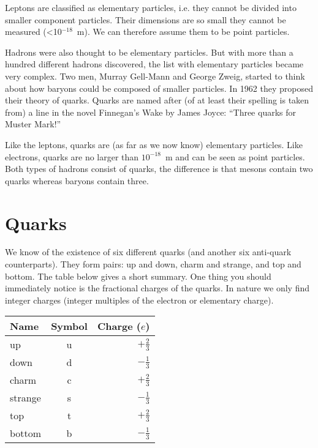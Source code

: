 \vspace{0.5cm}

Leptons are classified as elementary particles, i.e. they cannot be divided into smaller component particles. Their dimensions are so small they cannot be measured (\textless10$^{-18}$~m). We can therefore assume them to be point particles.

Hadrons were also thought to be elementary particles. But with more than a hundred different hadrons discovered, the list with elementary particles became very complex. Two men, Murray Gell-Mann and George Zweig, started to think about how baryons could be composed of smaller particles. In 1962 they proposed their theory of quarks. Quarks are named after (of at least their spelling is taken from) a line in the novel Finnegan's Wake by James Joyce: ``Three quarks for Muster Mark!''

Like the leptons, quarks are (as far as we now know) elementary particles. Like electrons, quarks are no larger than $10^{-18}$~m and can be seen as point particles. Both types of hadrons consist of quarks, the difference is that mesons contain two quarks whereas baryons contain three.

\section{Quarks}
We know of the existence of six different quarks (and another six anti-quark counterparts). They form pairs: up and down, charm and strange, and top and bottom. The table below gives a short summary. One thing you should immediately notice is the fractional charges of the quarks. In nature we only find integer charges (integer multiples of the electron or elementary charge).

\begin{center}\begin{tabular}[h] {l c r}
Name & Symbol & Charge ($e$) \\ \hline
up & u & $+\frac{2}{3}$ \\
down & d & $-\frac{1}{3}$ \\
charm & c & $+\frac{2}{3}$ \\
strange & s & $-\frac{1}{3}$ \\
top & t & $+\frac{2}{3}$ \\
bottom & b & $-\frac{1}{3}$ \\
\end{tabular}\end{center}
\label{tab:data_3}

